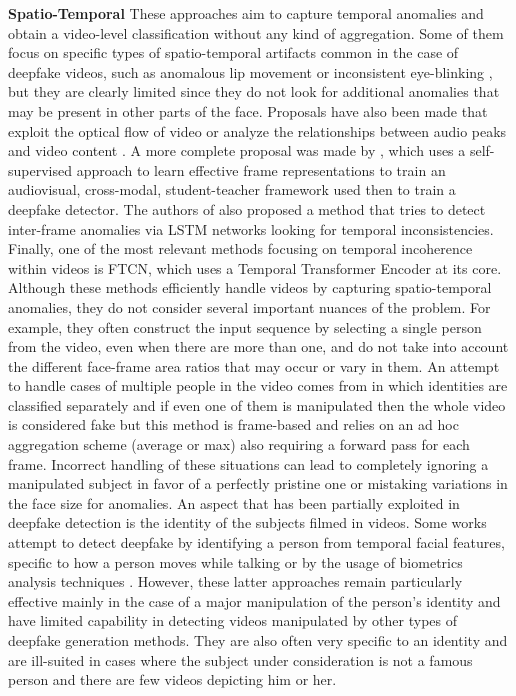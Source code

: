 \documentclass[10pt,twocolumn,letterpaper]{article}
\begin{document}
\textbf{Spatio-Temporal}
These approaches aim to capture temporal anomalies and obtain a video-level classification without any kind of aggregation. Some of them focus on specific types of spatio-temporal artifacts common in the case of deepfake videos, such as anomalous lip movement \cite{Haliassos2021LipsDL} or inconsistent eye-blinking \cite{8630787}, but they are clearly limited since they do not look for additional anomalies that may be present in other parts of the face. Proposals have also been made that exploit the optical flow of video \cite{9022558} or analyze the relationships between audio peaks and video content \cite{10.1145/3394171.3413570}. 
A more complete proposal was made by \cite{realforensics}, which uses a self-supervised approach to learn effective frame representations to train an audiovisual, cross-modal, student-teacher framework used then to train a deepfake detector. The authors of \cite{10.1145/3369412.3395070} also proposed a method that tries to detect inter-frame anomalies via LSTM networks looking for temporal inconsistencies. Finally, one of the most relevant methods focusing on temporal incoherence within videos is FTCN\cite{ftcn}, which uses a Temporal Transformer Encoder at its core. Although these methods efficiently handle videos by capturing spatio-temporal anomalies, they do not consider several important nuances of the problem. For example, they often construct the input sequence by selecting a single person from the video, even when there are more than one, and do not take into account the different face-frame area ratios that may occur or vary in them. An attempt to handle cases of multiple people in the video comes from \cite{10.1007/978-3-031-06433-3_19} in which identities are classified separately and if even one of them is manipulated then the whole video is considered fake but this method is frame-based and relies on an ad hoc aggregation scheme (average or max) also requiring a forward pass for each frame. Incorrect handling of these situations can lead to completely ignoring a manipulated subject in favor of a perfectly pristine one or mistaking variations in the face size for anomalies.
An aspect that has been partially exploited in deepfake detection is the identity of the subjects filmed in videos. Some works attempt to detect deepfake by identifying a person from temporal facial features, specific to how a person moves while talking \cite{9710044} or by the usage of  biometrics analysis techniques \cite{Agarwal2020DetectingDV}. However, these latter approaches remain particularly effective mainly in the case of a major manipulation of the person's identity and have limited capability in detecting videos manipulated by other types of deepfake generation methods. They are also often very specific to an identity and are ill-suited in cases where the subject under consideration is not a famous person and there are few videos depicting him or her.
\end{document}
